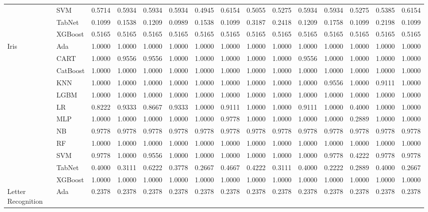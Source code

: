 \begin{table*}[ht]
{\begin{tabular}{llrrrrrrrrrrrrr}
 & SVM & 0.5714 & 0.5934 & 0.5934 & 0.5934 & 0.4945 & 0.6154 & 0.5055 & 0.5275 & 0.5934 & 0.5934 & 0.5275 & 0.5385 & 0.6154 \\
 & TabNet & 0.1099 & 0.1538 & 0.1209 & 0.0989 & 0.1538 & 0.1099 & 0.3187 & 0.2418 & 0.1209 & 0.1758 & 0.1099 & 0.2198 & 0.1099 \\
 & XGBoost & 0.5165 & 0.5165 & 0.5165 & 0.5165 & 0.5165 & 0.5165 & 0.5165 & 0.5165 & 0.5165 & 0.5165 & 0.5165 & 0.5165 & 0.5165 \\
\cline{1-15}
\multirow[t]{12}{*}{Iris} & Ada & 1.0000 & 1.0000 & 1.0000 & 1.0000 & 1.0000 & 1.0000 & 1.0000 & 1.0000 & 1.0000 & 1.0000 & 1.0000 & 1.0000 & 1.0000 \\
 & CART & 1.0000 & 0.9556 & 0.9556 & 1.0000 & 1.0000 & 1.0000 & 1.0000 & 1.0000 & 0.9556 & 1.0000 & 1.0000 & 1.0000 & 1.0000 \\
 & CatBoost & 1.0000 & 1.0000 & 1.0000 & 1.0000 & 1.0000 & 1.0000 & 1.0000 & 1.0000 & 1.0000 & 1.0000 & 1.0000 & 1.0000 & 1.0000 \\
 & KNN & 1.0000 & 1.0000 & 1.0000 & 1.0000 & 1.0000 & 1.0000 & 1.0000 & 1.0000 & 1.0000 & 0.9556 & 1.0000 & 0.9111 & 1.0000 \\
 & LGBM & 1.0000 & 1.0000 & 1.0000 & 1.0000 & 1.0000 & 1.0000 & 1.0000 & 1.0000 & 1.0000 & 1.0000 & 1.0000 & 1.0000 & 1.0000 \\
 & LR & 0.8222 & 0.9333 & 0.8667 & 0.9333 & 1.0000 & 0.9111 & 1.0000 & 1.0000 & 0.9111 & 1.0000 & 0.4000 & 1.0000 & 1.0000 \\
 & MLP & 1.0000 & 1.0000 & 1.0000 & 1.0000 & 1.0000 & 0.9778 & 1.0000 & 1.0000 & 1.0000 & 1.0000 & 0.2889 & 1.0000 & 1.0000 \\
 & NB & 0.9778 & 0.9778 & 0.9778 & 0.9778 & 0.9778 & 0.9778 & 0.9778 & 0.9778 & 0.9778 & 0.9778 & 0.9778 & 0.9778 & 0.9778 \\
 & RF & 1.0000 & 1.0000 & 1.0000 & 1.0000 & 1.0000 & 1.0000 & 1.0000 & 1.0000 & 1.0000 & 1.0000 & 1.0000 & 1.0000 & 1.0000 \\
 & SVM & 0.9778 & 1.0000 & 0.9556 & 1.0000 & 1.0000 & 1.0000 & 1.0000 & 1.0000 & 1.0000 & 0.9778 & 0.4222 & 0.9778 & 0.9778 \\
 & TabNet & 0.4000 & 0.3111 & 0.6222 & 0.3778 & 0.2667 & 0.4667 & 0.4222 & 0.3111 & 0.4000 & 0.2222 & 0.2889 & 0.4000 & 0.2667 \\
 & XGBoost & 1.0000 & 1.0000 & 1.0000 & 1.0000 & 1.0000 & 1.0000 & 1.0000 & 1.0000 & 1.0000 & 1.0000 & 1.0000 & 1.0000 & 1.0000 \\
\cline{1-15}
\multirow[t]{12}{*}{Letter Recognition} & Ada & 0.2378 & 0.2378 & 0.2378 & 0.2378 & 0.2378 & 0.2378 & 0.2378 & 0.2378 & 0.2378 & 0.2378 & 0.2378 & 0.2378 & 0.2378 \\

\end{tabular}}
\end{table*}
